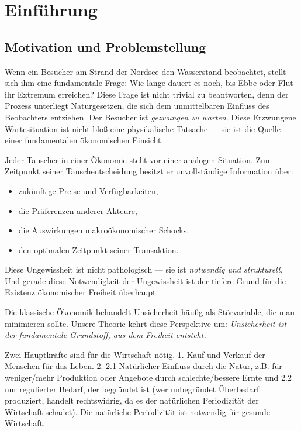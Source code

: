 \documentclass[a4paper, 12pt, twoside, openright]{report}
\theoremstyle{definition}
\theoremstyle{definition}
\begin{document}
\section{Einführung}

\subsection{Motivation und Problemstellung}

Wenn ein Besucher am Strand der Nordsee den Wasserstand beobachtet, stellt sich ihm eine fundamentale Frage: Wie lange dauert es noch, bis Ebbe oder Flut ihr Extremum erreichen? Diese Frage ist nicht trivial zu beantworten, denn der Prozess unterliegt Naturgesetzen, die sich dem unmittelbaren Einfluss des Beobachters entziehen. Der Besucher ist \emph{gezwungen zu warten}. Diese Erzwungene Wartesituation ist nicht bloß eine physikalische Tatsache --- sie ist die Quelle einer fundamentalen ökonomischen Einsicht.

Jeder Tauscher in einer Ökonomie steht vor einer analogen Situation. Zum Zeitpunkt seiner Tauschentscheidung besitzt er unvollständige Information über:
\begin{itemize}
    \item zukünftige Preise und Verfügbarkeiten,
    \item die Präferenzen anderer Akteure,
    \item die Auswirkungen makroökonomischer Schocks,
    \item den optimalen Zeitpunkt seiner Transaktion.
\end{itemize}

Diese Ungewissheit ist nicht pathologisch --- sie ist \emph{notwendig und strukturell}. Und gerade diese Notwendigkeit der Ungewissheit ist der tiefere Grund für die Existenz ökonomischer Freiheit überhaupt.

Die klassische Ökonomik behandelt Unsicherheit häufig als Störvariable, die man minimieren sollte. Unsere Theorie kehrt diese Perspektive um: \emph{Unsicherheit ist der fundamentale Grundstoff, aus dem Freiheit entsteht.}

Zwei Hauptkräfte sind für die Wirtschaft nötig. 1. Kauf und Verkauf der Menschen für das Leben. 2. 2.1 Natürlicher Einfluss durch die Natur, z.B. für weniger/mehr Produktion oder Angebote durch schlechte/bessere Ernte und 2.2 nur regulierter Bedarf, der begründet ist (wer unbegründet Überbedarf produziert, handelt rechtswidrig, da es der natürlichen Periodizität der Wirtschaft schadet). Die natürliche Periodizität ist notwendig für gesunde Wirtschaft.
\end{document}
